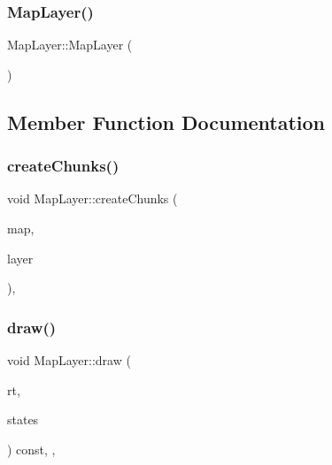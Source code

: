\mbox{\label{classMapLayer_af323ddae8da169a64be1e0c216034397}} 
\subsubsection{\texorpdfstring{Map\+Layer()}{MapLayer()}\hspace{0.1cm}{\footnotesize\ttfamily [2/2]}}
{\footnotesize\ttfamily Map\+Layer\+::\+Map\+Layer (\begin{DoxyParamCaption}\item[{const \hyperlink{classMapLayer}{Map\+Layer} \&}]{ }\end{DoxyParamCaption})\hspace{0.3cm}{\ttfamily [delete]}}



\subsection{Member Function Documentation}
\mbox{\label{classMapLayer_a853b2091fa76fabe4446797e0a01809a}} 
\subsubsection{\texorpdfstring{create\+Chunks()}{createChunks()}}
{\footnotesize\ttfamily void Map\+Layer\+::create\+Chunks (\begin{DoxyParamCaption}\item[{const tmx\+::\+Map \&}]{map,  }\item[{const tmx\+::\+Tile\+Layer \&}]{layer }\end{DoxyParamCaption})\hspace{0.3cm}{\ttfamily [inline]}, {\ttfamily [private]}}

\mbox{\label{classMapLayer_a6a43405b98f14c3efbe02395c466c1e6}} 
\subsubsection{\texorpdfstring{draw()}{draw()}}
{\footnotesize\ttfamily void Map\+Layer\+::draw (\begin{DoxyParamCaption}\item[{sf\+::\+Render\+Target \&}]{rt,  }\item[{sf\+::\+Render\+States}]{states }\end{DoxyParamCaption}) const\hspace{0.3cm}{\ttfamily [inline]}, {\ttfamily [override]}, {\ttfamily [private]}}

